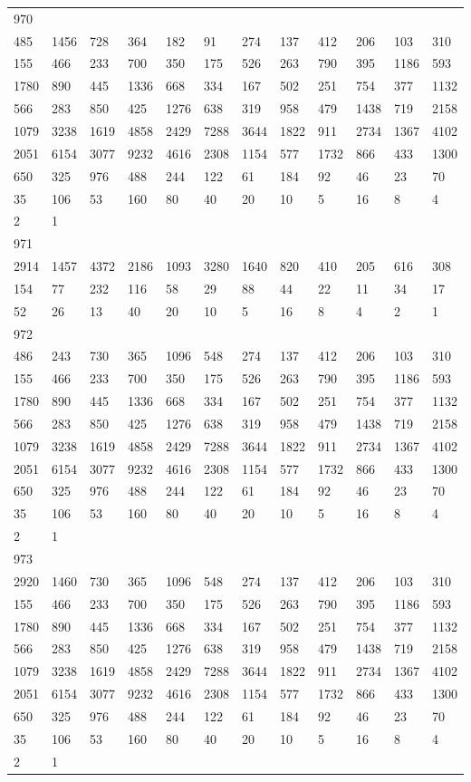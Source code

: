 \begin{longtable}{llllllllllll}
970&&&&&&&&&&&\\
485& 1456& 728& 364& 182& 91& 274& 137& 412& 206& 103& 310\\
155& 466& 233& 700& 350& 175& 526& 263& 790& 395& 1186& 593\\
1780& 890& 445& 1336& 668& 334& 167& 502& 251& 754& 377& 1132\\
566& 283& 850& 425& 1276& 638& 319& 958& 479& 1438& 719& 2158\\
1079& 3238& 1619& 4858& 2429& 7288& 3644& 1822& 911& 2734& 1367& 4102\\
2051& 6154& 3077& 9232& 4616& 2308& 1154& 577& 1732& 866& 433& 1300\\
650& 325& 976& 488& 244& 122& 61& 184& 92& 46& 23& 70\\
35& 106& 53& 160& 80& 40& 20& 10& 5& 16& 8& 4\\
2& 1& \\

971&&&&&&&&&&&\\
2914& 1457& 4372& 2186& 1093& 3280& 1640& 820& 410& 205& 616& 308\\
154& 77& 232& 116& 58& 29& 88& 44& 22& 11& 34& 17\\
52& 26& 13& 40& 20& 10& 5& 16& 8& 4& 2& 1\\

972&&&&&&&&&&&\\
486& 243& 730& 365& 1096& 548& 274& 137& 412& 206& 103& 310\\
155& 466& 233& 700& 350& 175& 526& 263& 790& 395& 1186& 593\\
1780& 890& 445& 1336& 668& 334& 167& 502& 251& 754& 377& 1132\\
566& 283& 850& 425& 1276& 638& 319& 958& 479& 1438& 719& 2158\\
1079& 3238& 1619& 4858& 2429& 7288& 3644& 1822& 911& 2734& 1367& 4102\\
2051& 6154& 3077& 9232& 4616& 2308& 1154& 577& 1732& 866& 433& 1300\\
650& 325& 976& 488& 244& 122& 61& 184& 92& 46& 23& 70\\
35& 106& 53& 160& 80& 40& 20& 10& 5& 16& 8& 4\\
2& 1& \\

973&&&&&&&&&&&\\
2920& 1460& 730& 365& 1096& 548& 274& 137& 412& 206& 103& 310\\
155& 466& 233& 700& 350& 175& 526& 263& 790& 395& 1186& 593\\
1780& 890& 445& 1336& 668& 334& 167& 502& 251& 754& 377& 1132\\
566& 283& 850& 425& 1276& 638& 319& 958& 479& 1438& 719& 2158\\
1079& 3238& 1619& 4858& 2429& 7288& 3644& 1822& 911& 2734& 1367& 4102\\
2051& 6154& 3077& 9232& 4616& 2308& 1154& 577& 1732& 866& 433& 1300\\
650& 325& 976& 488& 244& 122& 61& 184& 92& 46& 23& 70\\
35& 106& 53& 160& 80& 40& 20& 10& 5& 16& 8& 4\\
2& 1& \\


\end{longtable}
